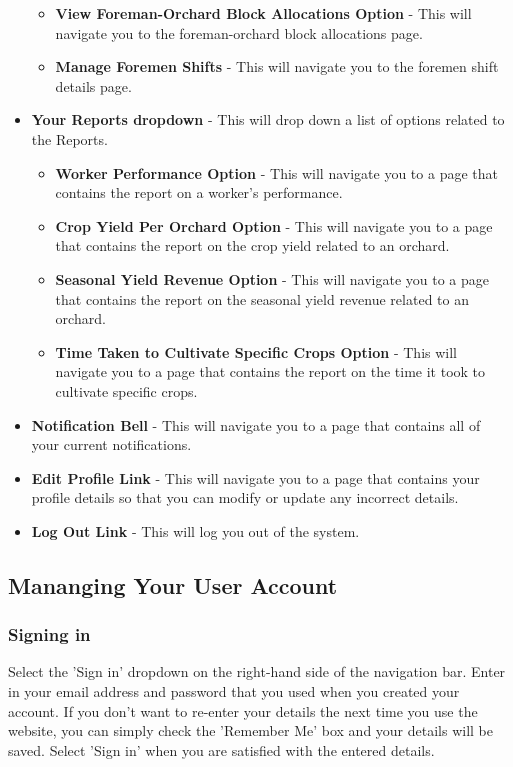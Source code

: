 \documentclass[11pt,fleqn]{book} %
\begin{document}
\begin{itemize}
\begin{itemize}
				\item \textbf{View Foreman-Orchard Block Allocations Option} - This will navigate you to the foreman-orchard block allocations page.
				\item \textbf{Manage Foremen Shifts} - This will navigate you to the foremen shift details page.
			\end{itemize}
			\item \textbf{Your Reports dropdown} - This will drop down a list of options related to the Reports.
			\begin{itemize}
				\item \textbf{Worker Performance Option} - This will navigate you to a page that contains the report on a worker's performance.
				\item \textbf{Crop Yield Per Orchard Option} - This will navigate you to a page that contains the report on the crop yield related to an orchard.
				\item \textbf{Seasonal Yield Revenue Option} - This will navigate you to a page that contains the report on the seasonal yield revenue related to an orchard.
				\item \textbf{Time Taken to Cultivate Specific Crops Option} - This will navigate you to a page that contains the report on the time it took to cultivate specific crops.	
			\end{itemize}
			\item \textbf{Notification Bell} - This will navigate you to a page that contains all of your current notifications.
			\item \textbf{Edit Profile Link} - This will navigate you to a page that contains your profile details so that you can modify or update any incorrect details.
			\item \textbf{Log Out Link} - This will log you out of the system.
		\end{itemize}
		\subsection{Mananging Your User Account}
			\subsubsection{Signing in}
				Select the 'Sign in' dropdown on the right-hand side of the navigation bar. Enter in your email address and password that you used when you created your account. If you don't want to re-enter your details the next time you use the website, you can simply check the 'Remember Me' box and your details will be saved. Select 'Sign in' when you are satisfied with the entered details.
\end{document}
